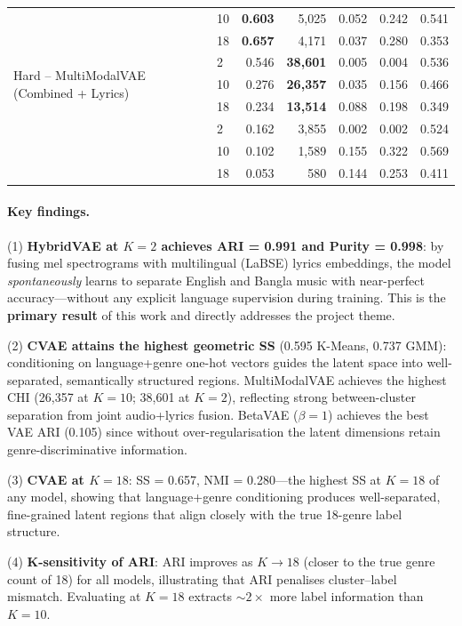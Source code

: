 \documentclass{article}
\begin{document}
\begin{table}[H]
\begin{tabular}{llrrrrr}
 & 10 & \textbf{0.603} & 5,025  & 0.052 & 0.242 & 0.541 \\
 & 18 & \textbf{0.657} & 4,171  & 0.037 & 0.280 & 0.353 \\
\midrule
\multirow{3}{*}{Hard -- MultiModalVAE (Combined + Lyrics)}
 & 2  & 0.546 & \textbf{38,601} & 0.005 & 0.004 & 0.536 \\
 & 10 & 0.276 & \textbf{26,357} & 0.035 & 0.156 & 0.466 \\
 & 18 & 0.234 & \textbf{13,514} & 0.088 & 0.198 & 0.349 \\
\midrule\rowcolor{gray!15}
\multirow{3}{*}{PCA + K-Means (baseline)}
 & 2  & 0.162 & 3,855  & 0.002 & 0.002 & 0.524 \\
 & 10 & 0.102 & 1,589  & 0.155 & 0.322 & 0.569 \\
 & 18 & 0.053 & 580    & 0.144 & 0.253 & 0.411 \\
\bottomrule
\end{tabular}
\end{table}

\paragraph{Key findings.}
(1) \textbf{HybridVAE at $K\!=\!2$ achieves ARI = 0.991 and Purity = 0.998}: by fusing mel spectrograms with multilingual (LaBSE) lyrics embeddings, the model \emph{spontaneously} learns to separate English and Bangla music with near-perfect accuracy---without any explicit language supervision during training. This is the \textbf{primary result} of this work and directly addresses the project theme.

(2) \textbf{CVAE attains the highest geometric SS} (0.595 K-Means, 0.737 GMM): conditioning on language+genre one-hot vectors guides the latent space into well-separated, semantically structured regions. MultiModalVAE achieves the highest CHI (26,357 at $K\!=\!10$; 38,601 at $K\!=\!2$), reflecting strong between-cluster separation from joint audio+lyrics fusion. BetaVAE ($\beta\!=\!1$) achieves the best VAE ARI (0.105) since without over-regularisation the latent dimensions retain genre-discriminative information.

(3) \textbf{CVAE at $K\!=\!18$}: SS = 0.657, NMI = 0.280---the highest SS at $K\!=\!18$ of any model, showing that language+genre conditioning produces well-separated, fine-grained latent regions that align closely with the true 18-genre label structure.

(4) \textbf{K-sensitivity of ARI}: ARI improves as $K \to 18$ (closer to the true genre count of 18) for all models, illustrating that ARI penalises cluster--label mismatch. Evaluating at $K\!=\!18$ extracts $\sim\!2\times$ more label information than $K\!=\!10$.
\end{document}
